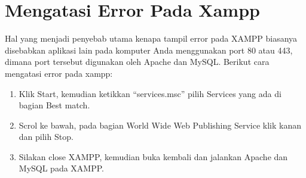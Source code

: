 \section{Mengatasi Error Pada Xampp}
Hal yang menjadi penyebab utama kenapa tampil error pada XAMPP biasanya disebabkan aplikasi lain pada komputer Anda menggunakan port 80 atau 443, dimana port tersebut digunakan oleh Apache dan MySQL. Berikut cara mengatasi error pada xampp:
\begin{enumerate}
    \item Klik Start, kemudian ketikkan “services.msc” pilih Services yang ada di bagian Best match.
    \item Scrol ke bawah, pada bagian World Wide Web Publishing Service klik kanan dan pilih Stop.
    \item Silakan close XAMPP, kemudian buka kembali dan jalankan Apache dan MySQL pada XAMPP.
\end{enumerate}

